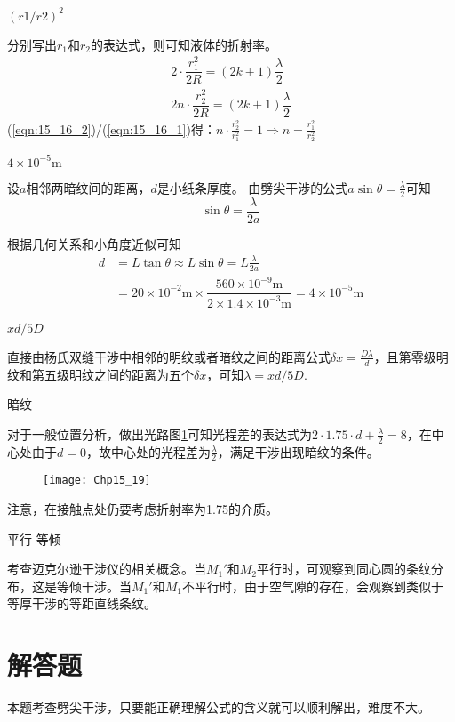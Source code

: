 \exercise $(r1/r2)^2$

\solve 分别写出$r_1$和$r_2$的表达式，则可知液体的折射率。
\begin{gather}
	2\cdot\dfrac{r_1^2}{2R}=(2k+1)\dfrac{\lambda}{2}\label{eqn:15_16_1}\\
	2n\cdot\dfrac{r_2^2}{2R}=(2k+1)\dfrac{\lambda}{2}\label{eqn:15_16_2}
\end{gather}
(\ref{eqn:15_16_2})/(\ref{eqn:15_16_1})得：$n\cdot\frac{r_2^2}{r_1^2}=1\Rightarrow n=\frac{r_1^2}{r_2^2}$


\exercise $4\times10^{-5}\mathrm{m}$

\solve 设$a$相邻两暗纹间的距离，$d$是小纸条厚度。
由劈尖干涉的公式$a\sin\theta=\frac{\lambda}{2}$可知
\[
\sin\theta=\frac{\lambda}{2a}
\]

根据几何关系和小角度近似可知
\begin{align*}
d&=L\tan\theta\approx L\sin\theta=L\frac{\lambda}{2a}\\
&=20\times 10^{-2}\mathrm{m}\times \dfrac{560\times 10^{-9}\mathrm{m}}{2\times 1.4\times 10^{-3}\mathrm{m}}=4\times 10^{-5}\mathrm{m}
\end{align*}

\exercise $xd/5D$

\solve 直接由杨氏双缝干涉中相邻的明纹或者暗纹之间的距离公式$\delta x=\frac{D\lambda}{d}$，且第零级明纹和第五级明纹之间的距离为五个$\delta x$，可知$\lambda=xd/5D$.

\exercise 暗纹

\solve 对于一般位置分析，做出光路图\ref{fig:15_19}可知光程差的表达式为$2\cdot 1.75\cdot d+\frac{\lambda}{2}=8$，在中心处由于$d=0$，故中心处的光程差为$\frac{\lambda}{2}$，满足干涉出现暗纹的条件。
\begin{figure}[!h]
	\centering
	\texttt{[image: Chp15\_19]}
	\caption{}\label{fig:15_19}
\end{figure}

注意，在接触点处仍要考虑折射率为1.75的介质。

\exercise 平行 等倾

\solve 考查迈克尔逊干涉仪的相关概念。当$M_1'$和$M_2$平行时，可观察到同心圆的条纹分布，这是等倾干涉。当$M_1'$和$M_1$不平行时，由于空气隙的存在，会观察到类似于等厚干涉的等距直线条纹。

\section{解答题}
\exercise 

\analysis
本题考查劈尖干涉，只要能正确理解公式的含义就可以顺利解出，难度不大。

